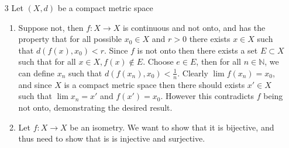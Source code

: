 \documentclass[12pt, letterpaper]{article}
\newcommand{\N}{\mathbb{N}}
\begin{document}
\begin{enumerate}
	\iffalse Note that if $Y = \emptyset$ then $Y$ fails to have a dense set by definition, so assume $Y \subseteq X, Y \neq \emptyset$.  Since $(X,d)$ is seperable then there exists $S \subseteq X$ such that $cl(S) \supseteq X$ and $|S| \leq \aleph_0$.   Note that if $Y$ is not the empty set then $S \cap Y$ must be 
	non-empty.  Otherwise if $S \cap Y = \emptyset$, then either $Y = \emptyset$ or 
	$Y =  cl(S) \backslash X$.  Note that the second option is a contradiction since 
	by definition $Y \not \subseteq X$.  The first option is eliminated by the first note of the proof.  Thus let $S_Y = S \cap Y$.  We claim that $S_Y$ is dense in $Y$.  Let $y \in Y$.
	For all $O_Y \subseteq Y$ with $y \in O_Y$ which are open under the subset topology (where $O_Y = O \cap Y, O \subseteq X$, $O$ is open), we just need to show that 
	$S_Y \cap O_Y \neq \emptyset$.  This means we must show that $S \cap Y \cap O \neq \emptyset$.   Since we're assuming that $Y \cap O \neq \emptyset$ then all conditions hold.  
	Therefore $S_Y \cap O_Y \neq \emptyset$.  
	\fi
	\iffalse Note that if $Y = \emptyset$ then $Y$ fails to have a dense set by definition, so assume $Y \subseteq X, Y \neq \emptyset$.  Since $(X,d)$ is seperable then there exists $S \subseteq X$ such that $cl(S) = X$ and $|S| \leq \aleph_0$.  We 
	claim that $S_Y = S \cap Y$ is a coutable dense subset of $Y$. Trivially $S_Y = S \cap Y \subseteq Y$.  Note that $S_Y$ is still countable since $|S_Y| = |S \cap Y|$ which implies that $|S_Y| \leq \aleph_0$ 
	and $|S_Y| \leq |Y|$. 
	 \fi
	\item[3] Let $(X,d)$ be a compact metric space
	\begin{enumerate}
		\item Suppose not, then $f: X \to X$ is continuous and not onto, and has the 
		property that for all possible $x_0 \in X$ and $r > 0$ there exists $x \in X$
		such that $d(f(x),x_0) < r$.  Since $f$ is not onto then there exists a set 
		$E \subset X$ such that for all $x \in X, f(x) \not \in E$.  Choose $e \in E$, 
		then for all $n \in \N$, we can define $x_n$ such that $d(f(x_n),x_0) < \frac{1}{n}$.  Clearly $\lim f(x_n) = x_0$, and since $X$ is a compact metric space then there 
		should exists $x' \in X$ such that $\lim x_n = x'$ and $f(x') = x_0$.  However 
		this contradicts $f$ being not onto, demonstrating the desired result.  
		\item Let $f: X \to X$ be an isometry.  We want to show that it is bijective, and thus need to show that is is injective and surjective.
		\begin{itemize}

\end{itemize}
\end{enumerate}
\end{enumerate}
\end{document}
